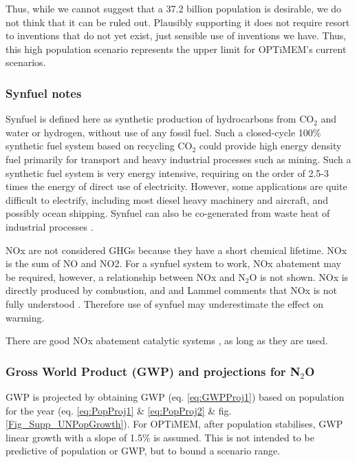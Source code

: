 \documentclass{article}
\begin{document}
Thus, while we cannot suggest that a 37.2 billion population is desirable, we do not think that it can be ruled out. Plausibly supporting it does not require resort to inventions that do not yet exist, just sensible use of inventions we have. Thus, this high population scenario represents the upper limit for OPTiMEM's current scenarios.

\subsubsection{Synfuel notes}

Synfuel is defined here as synthetic production of hydrocarbons from CO$_2$ and water or hydrogen, without use of any fossil fuel. 
Such a closed-cycle 100\%  synthetic fuel system based on recycling CO$_2$ could provide high energy density fuel primarily for transport and heavy industrial processes such as mining. Such a synthetic fuel system is very energy intensive, requiring on the order of 2.5-3 times the energy of direct use of electricity.  However, some applications are quite difficult to electrify, including most diesel heavy machinery and aircraft, and possibly ocean shipping. Synfuel can also be co-generated from waste heat of industrial processes \cite{Nguyen2015SynfuelCurrentStatus,Li2016GHGSynfuel,OZCAN2021SynfuelThermoEconAnalaysisWasteHeat}. 

NOx are not considered GHGs because they have a short chemical lifetime. NOx is the sum of NO and NO2. For a synfuel system to work, NOx abatement may be required, however, a relationship between NOx and N$_2$O is not shown. NOx is directly produced by combustion, and and Lammel comments that NOx is not fully understood \cite{Lammel1995GreenhouseOFNoX}. Therefore use of synfuel may underestimate the effect  on warming. 

There are good NOx abatement catalytic systems \cite{Ali2021NOx_reduction}, as long as they are used.

\subsubsection{Gross World Product (GWP) and projections for N$_2$O}
GWP is projected by obtaining GWP (eq. \ref{eq:GWPProj1}) based on population for the year (eq. \ref{eq:PopProj1} \& \ref{eq:PopProj2} \& fig. \ref{Fig_Supp_UNPopGrowth}). For OPTiMEM, after population stabilises, GWP linear growth with a slope of 1.5\% is assumed. This is not intended to be predictive of population or GWP, but to bound a scenario range.
\end{document}
